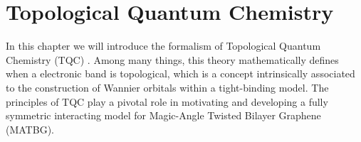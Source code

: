 %
%

\chapter{Topological Quantum Chemistry} \label{ch:topological_quantum_chemistry}

In this chapter we will introduce the formalism of Topological Quantum Chemistry (TQC) \cite{topological_quantum_chemistry2017, building_blocks2018, lectures_tms2017}. Among many things, this theory mathematically defines when a electronic band is topological, which is a concept intrinsically associated to the construction of Wannier orbitals within a tight-binding model. The principles of TQC play a pivotal role in motivating and developing a fully symmetric interacting model for Magic-Angle Twisted Bilayer Graphene (MATBG).

